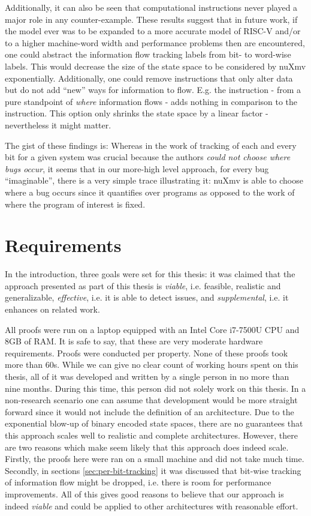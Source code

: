 Additionally, it can also be seen that computational instructions never played a major role in any counter-example.
These results suggest that in future work, if the model ever was to be expanded to a more accurate model of RISC-V and/or to a higher machine-word width and performance problems then are encountered, one could abstract the information flow tracking labels from bit- to word-wise labels.
This would decrease the size of the state space to be considered by nuXmv exponentially.
Additionally, one could remove instructions that only alter data but do not add \enquote{new} ways for information to flow.
E.g. the  instruction - from a pure standpoint of \textit{where} information flows - adds nothing in comparison to the  instruction.
This option only shrinks the state space by a linear factor - nevertheless it might matter.

The gist of these findings is:
Whereas in the work of \citeauthor{Ferraiuolo17} \cite{Ferraiuolo17} tracking of each and every bit for a given system was crucial because the authors \textit{could not choose where bugs occur}, it seems that in our more-high level approach, for every bug \enquote{imaginable}, there is a very simple trace illustrating it: nuXmv is able to choose where a bug occurs since it quantifies over programs as opposed to the work of \citeauthor{Ferraiuolo17} where the program of interest is fixed.

\section{Requirements}
\label{sec:discuss-requirements}

In the introduction, three goals were set for this thesis: it was claimed that the approach presented as part of this thesis is \textit{viable}, i.e. feasible, realistic and generalizable, \textit{effective}, i.e. it is able to detect issues, and \textit{supplemental}, i.e. it enhances on related work.

All proofs were run on a laptop equipped with an Intel Core i7-7500U CPU and 8GB of RAM.
It is safe to say, that these are very moderate hardware requirements.
Proofs were conducted per property.
None of these proofs took more than 60s.
While we can give no clear count of working hours spent on this thesis, all of it was developed and written by a single person in no more than nine months.
During this time, this person did not solely work on this thesis.
In a non-research scenario one can assume that development would be more straight forward since it would not include the definition of an architecture.
Due to the exponential blow-up of binary encoded state spaces, there are no guarantees that this approach scales well to realistic and complete architectures.
However, there are two reasons which make seem likely that this approach does indeed scale.
Firstly, the proofs here were ran on a small machine and did not take much time.
Secondly, in sections \ref{sec:per-bit-tracking} it was discussed that bit-wise tracking of information flow might be dropped, i.e. there is room for performance improvements.
All of this gives good reasons to believe that our approach is indeed \textit{viable} and could be applied to other architectures with reasonable effort.

